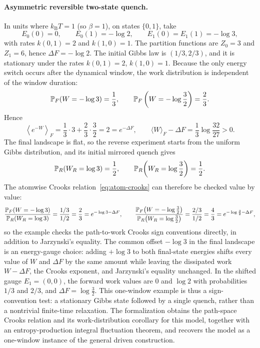 \paragraph{Asymmetric reversible two-state quench.}
In units where $k_{\mathrm B}T=1$ (so $\beta=1$), on states $\{0,1\}$, take
\[
  E_0(0)=0,\qquad E_0(1)=-\log 2,
  \qquad E_1(0)=E_1(1)=-\log 3,
\]
with rates $k(0,1)=2$ and $k(1,0)=1$. The partition functions are $Z_0=3$ and $Z_1=6$, hence $\Delta F=-\log 2$. The initial Gibbs law is $(1/3,2/3)$, and it is stationary under the rates $k(0,1)=2$, $k(1,0)=1$. Because the only energy switch occurs after the dynamical window, the work distribution is independent of the window duration:
\[
  \mathbb{P}_F(W=-\log 3)=\frac13,
  \qquad
  \mathbb{P}_F\left(W=-\log\frac32\right)=\frac23.
\]
Hence
\[
  \left\langle e^{-W}\right\rangle_F
  =\frac13\cdot3+\frac23\cdot\frac32
  =2=e^{-\Delta F},
  \qquad
  \langle W\rangle_F-\Delta F
  =\frac13\log\frac{32}{27}>0.
\]
The final landscape is flat, so the reverse experiment starts from the uniform Gibbs distribution, and its initial mirrored quench gives
\[
  \mathbb{P}_R(W_R=\log 3)=\frac12,
  \qquad
  \mathbb{P}_R\!\left(W_R=\log\frac32\right)=\frac12.
\]
The atomwise Crooks relation~\eqref{eq:atom-crooks} can therefore be checked value by value:
\[
  \frac{\mathbb{P}_F(W=-\log 3)}{\mathbb{P}_R(W_R=\log 3)}
  =\frac{1/3}{1/2}=\frac23
  =e^{-\log 3-\Delta F},
  \qquad
  \frac{\mathbb{P}_F\bigl(W=-\log\tfrac32\bigr)}{\mathbb{P}_R\bigl(W_R=\log\tfrac32\bigr)}
  =\frac{2/3}{1/2}=\frac43
  =e^{-\log\frac32-\Delta F},
\]
so the example checks the path-to-work Crooks sign conventions directly, in addition to Jarzynski's equality. The common offset $-\log 3$ in the final landscape is an energy-gauge choice: adding $+\log 3$ to both final-state energies shifts every value of $W$ and $\Delta F$ by the same amount while leaving the dissipated work $W-\Delta F$, the Crooks exponent, and Jarzynski's equality unchanged. In the shifted gauge $E_1=(0,0)$, the forward work values are $0$ and $\log 2$ with probabilities $1/3$ and $2/3$, and $\Delta F=\log\frac32$. This one-window example is thus a sign-convention test: a stationary Gibbs state followed by a single quench, rather than a nontrivial finite-time relaxation. The formalization obtains the path-space Crooks relation and its work-distribution corollary for this model, together with an entropy-production integral fluctuation theorem, and recovers the model as a one-window instance of the general driven construction.

